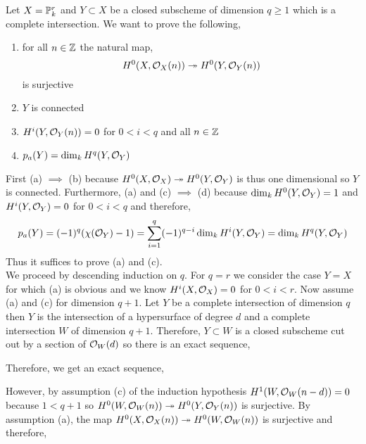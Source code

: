 \documentclass[12pt]{article}
\begin{document}
Let $X = \P^r_k$ and $Y \subset X$ be a closed subscheme of dimension $q \ge 1$ which is a complete intersection. We want to prove the following,
\begin{enumerate}
\item for all $n \in \Z$ the natural map,
\[ H^0(X, \struct{X}(n)) \onto H^0(Y, \struct{Y}(n)) \]
is surjective

\item $Y$ is connected

\item $H^i(Y, \struct{Y}(n)) = 0$ for $0 < i < q$ and all $n \in \Z$

\item $p_a(Y) = \dim_k H^q(Y, \struct{Y})$
\end{enumerate}
First (a) $\implies$ (b) because $H^0(X, \struct{X}) \onto H^0(Y, \struct{Y})$ is thus one dimensional so $Y$ is connected. Furthermore, (a) and (c) $\implies$ (d) because $\dim_k H^0(Y, \struct{Y}) = 1$ and $H^i(Y, \struct{Y}) = 0$ for $0 < i < q$ and therefore,
\[ p_a(Y) = (-1)^{q} (\chi(\struct{Y}) - 1) = \sum_{i = 1}^q (-1)^{q - i} \dim_k H^i(Y, \struct{Y}) = \dim_k H^q(Y, \struct{Y}) \]
Thus it suffices to prove (a) and (c).
\bigskip\\
We proceed by descending induction on $q$. For $q = r$ we consider the case $Y = X$ for which (a) is obvious and we know $H^i(X, \struct{X}) = 0$ for $0 < i < r$. Now assume (a) and (c) for dimension $q + 1$. Let $Y$ be a complete intersection of dimension $q$ then $Y$ is the intersection of a hypersurface of degree $d$ and a complete intersection $W$ of dimension $q + 1$. Therefore, $Y \subset W$ is a closed subscheme cut out by a section of $\struct{W}(d)$ so there is an exact sequence,
\begin{center}
\end{center}
Therefore, we get an exact sequence,
\begin{center}
\end{center}
However, by assumption (c) of the induction hypothesis $H^1(W, \struct{W}(n-d)) = 0$ because $1 < q + 1$ so $H^0(W, \struct{W}(n)) \onto H^0(Y, \struct{Y}(n))$ is surjective. By assumption (a), the map $H^0(X, \struct{X}(n)) \onto H^0(W, \struct{W}(n))$ is surjective and therefore,
\end{document}
